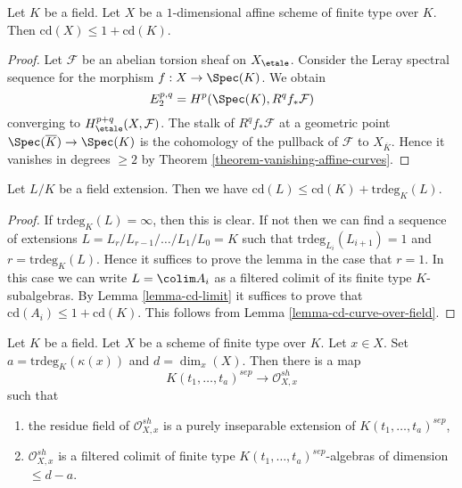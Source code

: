 \begin{lemma}
\label{lemma-cd-curve-over-field}
Let $K$ be a field. Let $X$ be a $1$-dimensional
affine scheme of finite type over $K$. Then
$\text{cd}(X) \leq 1 + \text{cd}(K)$.
\end{lemma}

\begin{proof}
Let $\mathcal{F}$ be an abelian torsion sheaf on $X_\etale$.
Consider the Leray spectral sequence for the morphism
$f : X \to \Spec(K)$. We obtain
$$
E_2^{p, q} = H^p(\Spec(K), R^qf_*\mathcal{F})
$$
converging to $H^{p + q}_\etale(X, \mathcal{F})$.
The stalk of $R^qf_*\mathcal{F}$ at a geometric point
$\Spec(\overline{K}) \to \Spec(K)$ is the cohomology of the
pullback of $\mathcal{F}$ to $X_{\overline{K}}$.
Hence it vanishes in degrees $\geq 2$ by
Theorem \ref{theorem-vanishing-affine-curves}.
\end{proof}

\begin{lemma}
\label{lemma-cd-field-extension}
Let $L/K$ be a field extension. Then we have
$\text{cd}(L) \leq \text{cd}(K) + \text{trdeg}_K(L)$.
\end{lemma}

\begin{proof}
If $\text{trdeg}_K(L) = \infty$, then this is clear.
If not then we can find a sequence of extensions
$L= L_r/L_{r - 1}/ \ldots /L_1/L_0 = K$ such that
$\text{trdeg}_{L_i}(L_{i + 1}) = 1$ and $r = \text{trdeg}_K(L)$.
Hence it suffices to prove the lemma in the case that $r = 1$.
In this case we can write $L = \colim A_i$
as a filtered colimit of its finite type $K$-subalgebras.
By Lemma \ref{lemma-cd-limit} it suffices to prove that
$\text{cd}(A_i) \leq 1 + \text{cd}(K)$. This follows
from Lemma \ref{lemma-cd-curve-over-field}.
\end{proof}

\begin{lemma}
\label{lemma-strictly-henselian}
Let $K$ be a field. Let $X$ be a scheme of finite type over $K$.
Let $x \in X$. Set $a = \text{trdeg}_K(\kappa(x))$
and $d = \dim_x(X)$. Then there is a map
$$
K(t_1, \ldots, t_a)^{sep} \longrightarrow \mathcal{O}_{X, x}^{sh}
$$
such that
\begin{enumerate}
\item the residue field of $\mathcal{O}_{X, x}^{sh}$ is a purely inseparable
extension of $K(t_1, \ldots, t_a)^{sep}$,
\item $\mathcal{O}_{X, x}^{sh}$ is a filtered colimit of finite
type $K(t_1, \ldots, t_a)^{sep}$-algebras of dimension $\leq d - a$.
\end{enumerate}
\end{lemma}

